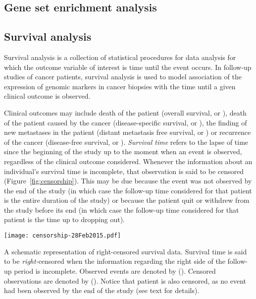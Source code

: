 \subsection{Gene set enrichment analysis}
\label{sec:methods-gsea}

\subsection{Survival analysis}
\label{sec:methods-survival-analysis}

Survival analysis is a collection of statistical procedures for data analysis
for which the outcome variable of interest is time until the event
occurs.\cite{kleinbaum_survival_1996} In follow-up studies of cancer patients,
survival analysis is used to model association of the expression of genomic
markers in cancer biopsies with the time until a given clinical outcome is
observed.

Clinical outcomes may include death of the patient (overall survival, or
), death of the patient caused by the cancer (disease-specific
survival, or ), the finding of new metastases in the patient
(distant metastasis free survival, or ) or recurrence of the
cancer (disease-free survival, or ).  \emph{Survival time} refers
to the lapse of time since the beginning of the study up to the moment when an
event is observed, regardless of the clinical outcome considered.  Whenever the
information about an individual's survival time is incomplete, that observation
is said to be censored (Figure~\ref{fig:censorship}).  This may be due because
the event was not observed by the end of the study (in which case the follow-up
time considered for that patient is the entire duration of the study) or because
the patient quit or withdrew from the study before its end (in which case the
follow-up time considered for that patient is the time up to dropping out).

\begin{marginfigure}%
  \texttt{[image: censorship-28Feb2015.pdf]}
  \caption[Right-censored survival data]{A schematic representation of
    right-censored survival data.  Survival time is said to be
    \emph{right-}censored when the information regarding the right side of the
    follow-up period is incomplete.  Observed events are denoted by (\CIRCLE).
    Censored observations are denoted by (\Circle).  Notice that patient
     is also censored, as no event had been observed by the end
    of the study (see text for details).}\label{fig:censorship}%
\end{marginfigure}


